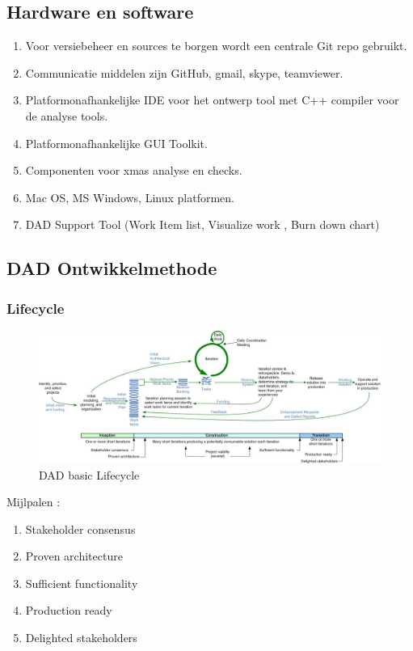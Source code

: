 \subsection{Hardware en software}
\begin{enumerate}
	\item Voor versiebeheer en sources te borgen wordt een centrale Git repo gebruikt.
	\item Communicatie middelen zijn GitHub, gmail, skype,  teamviewer.
	\item Platformonafhankelijke IDE voor het ontwerp tool met C++ compiler voor de analyse tools.
	\item Platformonafhankelijke GUI Toolkit.
	\item Componenten voor xmas analyse en checks.
	\item Mac OS,  MS Windows, Linux platformen.
	\item DAD Support Tool (Work Item list, Visualize work , Burn down chart)
\end{enumerate}


\subsection{DAD Ontwikkelmethode}
\subsubsection{Lifecycle}

\begin{figure}[h]
  \includegraphics[width=1.0\textwidth]{dadLifecycleUP2}
  \caption{DAD basic Lifecycle}
\end{figure}
Mijlpalen :
\begin{enumerate}
\item Stakeholder consensus
\item Proven architecture
\item Sufficient functionality
\item Production ready
\item Delighted stakeholders
\end{enumerate}

